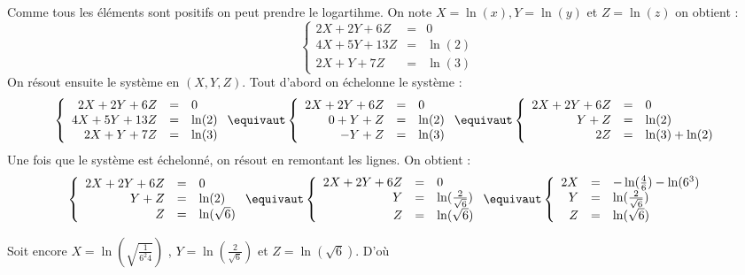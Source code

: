 \begin{correction}
Comme tous les éléments sont positifs on peut prendre le logartihme. 
On note $X= \ln(x), Y=\ln(y)$ et $Z=\ln(z)$ on obtient : 
$$\left\{ \begin{array}{ccc}
2X +2Y+6Z& =& 0\\
4X+5Y+13Z& =& \ln(2) \\
2X+Y+7Z & =& \ln(3)
\end{array}\right. $$
On résout ensuite le système en $(X,Y,Z)$. Tout d'abord on échelonne le système : 
$$\left\{ \begin{array}{rcl}
2X +2Y+6Z& =& 0\\
4X+5Y+13Z& =& \ln(2) \\
2X+Y+7Z & =& \ln(3)
\end{array}\right. \equivaut 
\left\{ \begin{array}{rcl}
2X +2Y+6Z& =& 0\\
0+Y+Z& =& \ln(2) \\
-Y+Z & =& \ln(3)
\end{array}\right. \equivaut 
\left\{ \begin{array}{rcl}
2X +2Y+6Z& =& 0\\
Y+Z& =& \ln(2) \\
2 Z & =& \ln(3) +\ln(2)
\end{array}\right.$$
Une fois que le système est échelonné, on résout en remontant les lignes. 
On obtient : 
$$\left\{ \begin{array}{rcl}
2X +2Y+6Z& =& 0\\
Y+Z& =& \ln(2) \\
Z & =& \ln(\sqrt{6})
\end{array}\right. \equivaut 
\left\{ \begin{array}{rcl}
2X +2Y+6Z& =& 0\\
Y& =& \ln(\frac{2}{\sqrt{6}}) \\
Z & =& \ln(\sqrt{6})
\end{array}\right. \equivaut 
\left\{ \begin{array}{rcl}
2X & =& -\ln(\frac{4}{6})  -\ln(6^3)\\
Y& =& \ln(\frac{2}{\sqrt{6}}) \\
Z & =& \ln(\sqrt{6})
\end{array}\right.
$$


Soit encore  $X= \ln( \sqrt{\frac{1}{6^2 4}}) $ , $Y = \ln(\frac{2}{\sqrt{6}}) $ et $Z= \ln(\sqrt{6})$. 
D'où 

\end{correction}

